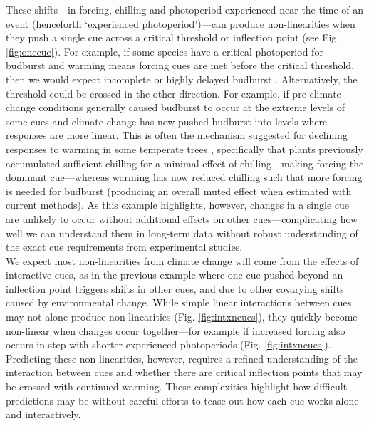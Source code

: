 \documentclass[11pt,letter]{article}
\begin{document}
These shifts---in forcing, chilling and photoperiod experienced near the time of an event (henceforth `experienced photoperiod')---can produce non-linearities when they push a single cue across a critical threshold or inflection point (see Fig. \ref{fig:onecue}). For example, if some species have a critical photoperiod for budburst and warming means forcing cues are met before the critical threshold, then we would expect incomplete or highly delayed budburst \citep{Singh:2017,rinne2018}. Alternatively, the threshold could be crossed in the other direction. For example, if pre-climate change conditions generally caused budburst to occur at the extreme levels of some cues and climate change has now pushed budburst into levels where responses are more linear. This is often the mechanism suggested for declining responses to warming in some temperate trees \citep{fu2015,piao2017,gauzere2019}, specifically that plants previously accumulated sufficient chilling for a minimal effect of chilling---making forcing the dominant cue---whereas warming has now reduced chilling such that more forcing is needed for budburst (producing an overall muted effect when estimated with current methods). As this example highlights, however, changes in a single cue are unlikely to occur without additional effects on other cues---complicating how well we can understand them in long-term data without robust understanding of the exact cue requirements from experimental studies.\\

We expect most non-linearities from climate change will come from the effects of interactive cues, as in the previous example where one cue pushed beyond an inflection point triggers shifts in other cues, and due to other covarying shifts caused by environmental change. While simple linear interactions between cues may not alone produce non-linearities (Fig. \ref{fig:intxncues}), they quickly become non-linear when changes occur together---for example if increased forcing also occurs in step with shorter experienced photoperiods (Fig. \ref{fig:intxncues}). Predicting these non-linearities, however, requires a refined understanding of the interaction between cues and whether there are critical inflection points that may be crossed with continued warming. These complexities highlight how difficult predictions may be without careful efforts to tease out how each cue works alone and interactively. \\ 
\end{document}
